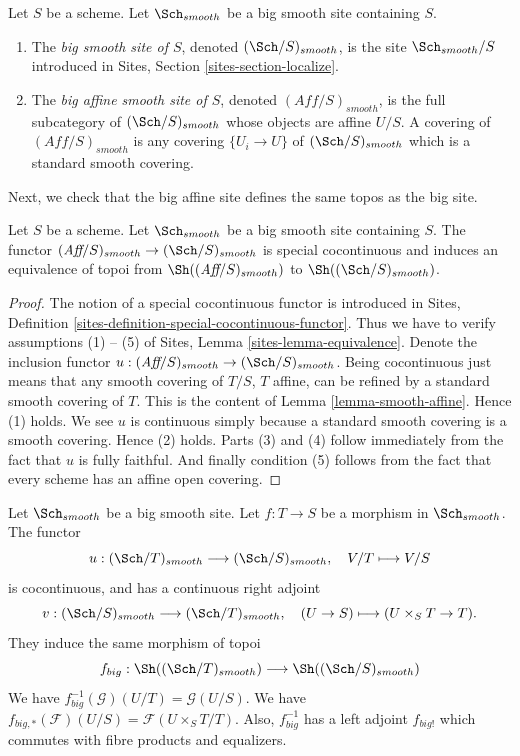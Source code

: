 \begin{definition}
\label{definition-big-small-smooth}
Let $S$ be a scheme. Let $\Sch_{smooth}$ be a big smooth
site containing $S$.
\begin{enumerate}
\item The {\it big smooth site of $S$}, denoted
$(\Sch/S)_{smooth}$, is the site $\Sch_{smooth}/S$
introduced in Sites, Section \ref{sites-section-localize}.
\item The {\it big affine smooth site of $S$}, denoted
$(\textit{Aff}/S)_{smooth}$, is the full subcategory of
$(\Sch/S)_{smooth}$ whose objects are affine $U/S$.
A covering of $(\textit{Aff}/S)_{smooth}$ is any covering
$\{U_i \to U\}$ of $(\Sch/S)_{smooth}$ which is a
standard smooth covering.
\end{enumerate}
\end{definition}

\noindent
Next, we check that the big affine site defines the same
topos as the big site.

\begin{lemma}
\label{lemma-affine-big-site-smooth}
Let $S$ be a scheme. Let $\Sch_{smooth}$ be a big smooth
site containing $S$.
The functor
$(\textit{Aff}/S)_{smooth} \to (\Sch/S)_{smooth}$
is special cocontinuous and induces an equivalence of topoi from
$\Sh((\textit{Aff}/S)_{smooth})$ to
$\Sh((\Sch/S)_{smooth})$.
\end{lemma}

\begin{proof}
The notion of a special cocontinuous functor is introduced in
Sites, Definition \ref{sites-definition-special-cocontinuous-functor}.
Thus we have to verify assumptions (1) -- (5) of
Sites, Lemma \ref{sites-lemma-equivalence}.
Denote the inclusion functor
$u : (\textit{Aff}/S)_{smooth} \to (\Sch/S)_{smooth}$.
Being cocontinuous just means that any smooth covering of
$T/S$, $T$ affine, can be refined by a standard smooth covering of $T$.
This is the content of
Lemma \ref{lemma-smooth-affine}.
Hence (1) holds. We see $u$ is continuous simply because a standard
smooth covering is a smooth covering. Hence (2) holds.
Parts (3) and (4) follow immediately from the fact that $u$ is
fully faithful. And finally condition (5) follows from the
fact that every scheme has an affine open covering.
\end{proof}

\begin{lemma}
\label{lemma-morphism-big-smooth}
Let $\Sch_{smooth}$ be a big smooth site.
Let $f : T \to S$ be a morphism in $\Sch_{smooth}$.
The functor
$$
u : (\Sch/T)_{smooth} \longrightarrow (\Sch/S)_{smooth},
\quad
V/T \longmapsto V/S
$$
is cocontinuous, and has a continuous right adjoint
$$
v : (\Sch/S)_{smooth} \longrightarrow (\Sch/T)_{smooth},
\quad
(U \to S) \longmapsto (U \times_S T \to T).
$$
They induce the same morphism of topoi
$$
f_{big} :
\Sh((\Sch/T)_{smooth})
\longrightarrow
\Sh((\Sch/S)_{smooth})
$$
We have $f_{big}^{-1}(\mathcal{G})(U/T) = \mathcal{G}(U/S)$.
We have $f_{big, *}(\mathcal{F})(U/S) = \mathcal{F}(U \times_S T/T)$.
Also, $f_{big}^{-1}$ has a left adjoint $f_{big!}$ which commutes with
fibre products and equalizers.
\end{lemma}


